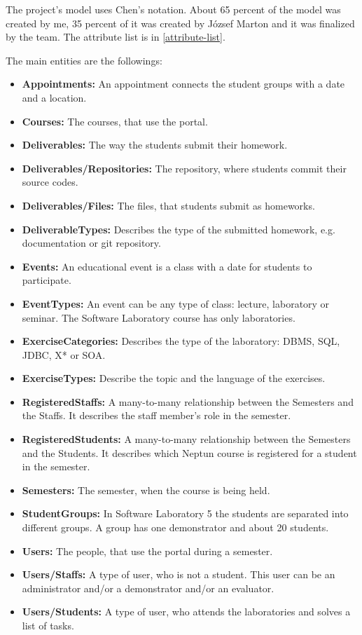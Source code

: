 The project's model uses Chen's notation. About 65 percent of the model was created by me, 35 percent of it was created by József Marton and it was finalized by the team. The attribute list is in \ref{attribute-list}.

 The main entities are the followings:

\begin{itemize}
	\item \textbf{Appointments:} An appointment connects the student groups with a date and a location.
	\item \textbf{Courses:} The courses, that use the portal.
	\item \textbf{Deliverables:} The way the students submit their homework. 
	\item \textbf{Deliverables/Repositories:} The repository, where students commit their source codes. 
	\item \textbf{Deliverables/Files:} The files, that students submit as homeworks. 
	\item \textbf{DeliverableTypes:} Describes the type of the submitted homework, e.g. documentation or git repository. 
	\item \textbf{Events:} An educational event is a class with a date for students	to participate.
	\item \textbf{EventTypes:} An event can be any type of class: lecture, laboratory or seminar. The Software Laboratory course has only laboratories.
	\item \textbf{ExerciseCategories:} Describes the type of the laboratory: DBMS, SQL, JDBC, X* or SOA.
	\item \textbf{ExerciseTypes:} Describe the topic and the language of the exercises. 
	\item \textbf{RegisteredStaffs:} A many-to-many relationship between the Semesters and the Staffs. It describes the staff member's role in the semester.
	\item \textbf{RegisteredStudents:} A many-to-many relationship between the Semesters and the Students. It describes which Neptun course is registered for a student in the semester.
	\item \textbf{Semesters:} The semester, when the course is being held.
	\item \textbf{StudentGroups:} In Software Laboratory 5 the students are separated into different groups. A group has one demonstrator and about 20 students.
	\item \textbf{Users:} The people, that use the portal during a semester.
	\item \textbf{Users/Staffs:} A type of user, who is not a student. This user can be an administrator and/or a demonstrator and/or an evaluator.
	\item \textbf{Users/Students:} A type of user, who attends the laboratories and solves a list of tasks.
\end{itemize}

